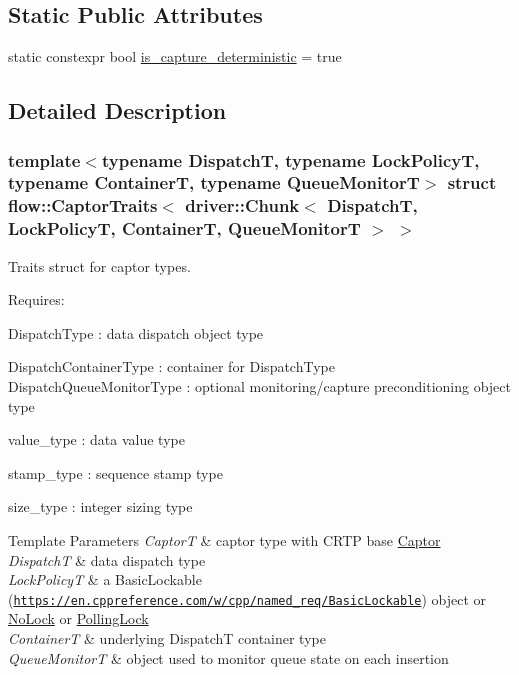 \subsection*{Static Public Attributes}
\begin{DoxyCompactItemize}
\item 
static constexpr bool \hyperlink{structflow_1_1_captor_traits_3_01driver_1_1_chunk_3_01_dispatch_t_00_01_lock_policy_t_00_01_contf25136d799b84e6e744301cf371fdfc2_ada5c859ac589ebdf628e3f687e43e188}{is\+\_\+capture\+\_\+deterministic} = true
\end{DoxyCompactItemize}


\subsection{Detailed Description}
\subsubsection*{template$<$typename DispatchT, typename Lock\+PolicyT, typename ContainerT, typename Queue\+MonitorT$>$\newline
struct flow\+::\+Captor\+Traits$<$ driver\+::\+Chunk$<$ Dispatch\+T, Lock\+Policy\+T, Container\+T, Queue\+Monitor\+T $>$ $>$}

Traits struct for captor types. 

Requires\+:
\begin{DoxyItemize}
\item {\ttfamily Dispatch\+Type} \+: data dispatch object type
\item {\ttfamily Dispatch\+Container\+Type} \+: container for {\ttfamily Dispatch\+Type} {\ttfamily Dispatch\+Queue\+Monitor\+Type} \+: optional monitoring/capture preconditioning object type
\item {\ttfamily value\+\_\+type} \+: data value type
\item {\ttfamily stamp\+\_\+type} \+: sequence stamp type
\item {\ttfamily size\+\_\+type} \+: integer sizing type
\end{DoxyItemize}


\begin{DoxyTemplParams}{Template Parameters}
{\em CaptorT} & captor type with C\+R\+TP base {\ttfamily \hyperlink{classflow_1_1_captor}{Captor}}\\
\hline
{\em DispatchT} & data dispatch type \\
\hline
{\em Lock\+PolicyT} & a Basic\+Lockable (\href{https://en.cppreference.com/w/cpp/named_req/BasicLockable}{\tt https\+://en.\+cppreference.\+com/w/cpp/named\+\_\+req/\+Basic\+Lockable}) object or \hyperlink{structflow_1_1_no_lock}{No\+Lock} or \hyperlink{structflow_1_1_polling_lock}{Polling\+Lock} \\
\hline
{\em ContainerT} & underlying {\ttfamily DispatchT} container type \\
\hline
{\em Queue\+MonitorT} & object used to monitor queue state on each insertion \\
\hline
\end{DoxyTemplParams}


